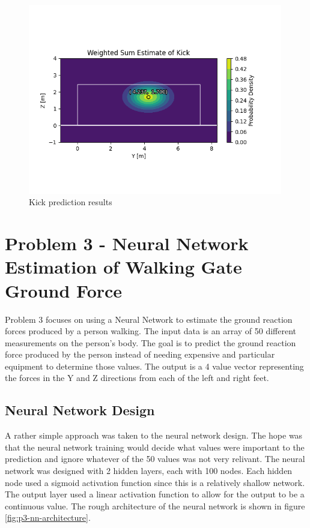 \documentclass[12pt]{article}
\begin{document}
\begin{figure}[H]
    \centering
    \includegraphics[width=0.99\textwidth]{Problem 2/out/weighted_sum_probability_dist.png}
    \caption{Kick prediction results}
    \label{fig:p2-weighted-sum-results}
\end{figure}


\section{Problem 3 - Neural Network Estimation of Walking Gate Ground Force}
Problem 3 focuses on using a Neural Network to estimate the ground reaction forces produced by a person walking. The input data is an array of 50 different measurements on the person's body. The goal is to predict the ground reaction force produced by the person instead of needing expensive and particular equipment to determine those values. The output is a 4 value vector representing the forces in the Y and Z directions from each of the left and right feet.

\subsection{Neural Network Design}
A rather simple approach was taken to the neural network design. The hope was that the neural network training would decide what values were important to the prediction and ignore whatever of the 50 values was not very relivant. The neural network was designed with 2 hidden layers, each with 100 nodes. Each hidden node used a sigmoid activation function since this is a relatively shallow network. The output layer used a linear activation function to allow for the output to be a continuous value. The rough architecture of the neural network is shown in figure \ref{fig:p3-nn-architecture}.
\end{document}
